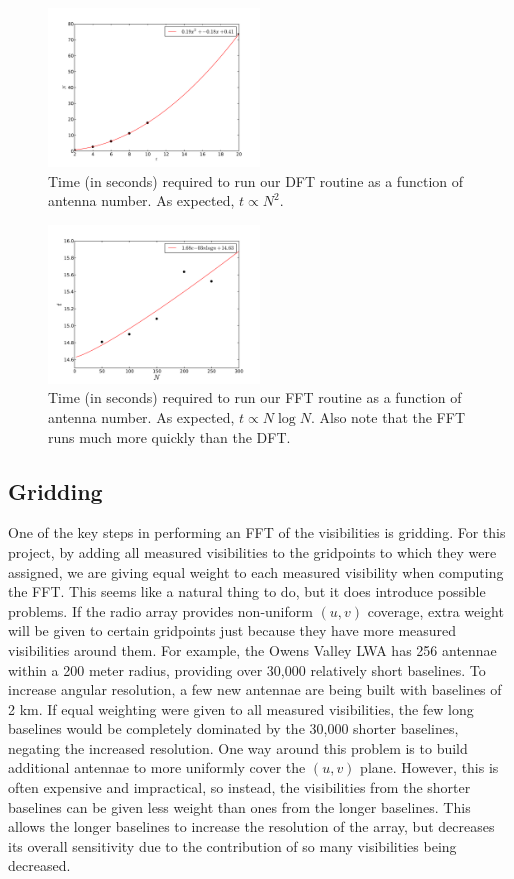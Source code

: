 \documentclass[11pt,letterpaper]{article}
\begin{document}
\begin{figure}[!h]
\centering
\includegraphics[width=0.5\textwidth]{DFT_image_timing.pdf}
\caption{Time (in seconds) required to run our DFT routine as a function of 
antenna number.  As expected, $t\propto N^2$.}
\label{fig:DFTtime}
\end{figure}

\begin{figure}[!h]
\centering
\includegraphics[width=0.5\textwidth]{FFT_image_timing.pdf}
\caption{Time (in seconds) required to run our FFT routine as a function of 
antenna number.  As expected, $t\propto N\log N$.  Also note that the FFT 
runs much more quickly than the DFT.}
\label{fig:FFTtime}
\end{figure}

\subsection{Gridding}
One of the key steps in performing an FFT of the visibilities is gridding.  
For this project, by adding all measured visibilities to the gridpoints 
to which they were assigned, we are giving equal weight to each 
measured visibility when computing the FFT.  This seems like a natural 
thing to do, but it does introduce possible problems.  If the radio array 
provides non-uniform $(u,v)$ coverage, extra weight will be given to 
certain gridpoints just because they have more measured 
visibilities around them.  For example, the Owens Valley LWA 
has 256 antennae within a 200 meter radius, providing over 
30,000 relatively short baselines.  To increase angular 
resolution, a few new antennae are being built with baselines 
of 2 km.  If equal weighting were given to all measured visibilities, 
the few long baselines would be completely dominated by the 30,000 
shorter baselines, negating the increased resolution.  One way around 
this problem is to build additional antennae to more uniformly cover the 
$(u,v)$ plane.  However, this is often expensive and impractical, so instead, 
the visibilities from the shorter baselines can be given less weight than 
ones from the longer baselines.  This allows the longer baselines to 
increase the resolution of the array, but decreases its overall 
sensitivity due to the contribution of so many visibilities being decreased.
\end{document}
